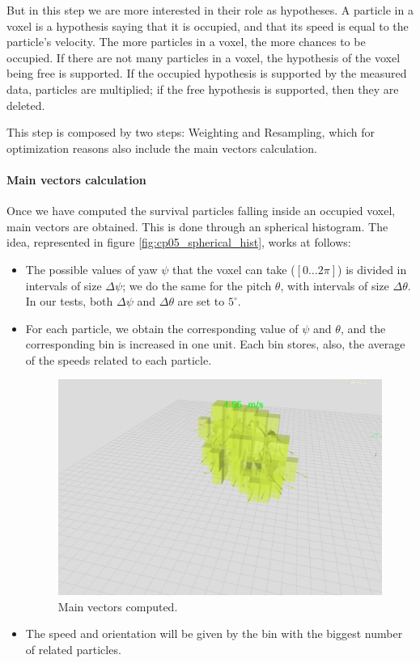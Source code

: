 But in this step we are more interested in their role as hypotheses. A particle in a voxel is a hypothesis saying that it is occupied, and that its speed is equal to the particle's velocity. The more particles in a voxel, the more chances to be occupied. If there are not many particles in a voxel, the hypothesis of the voxel being free is supported. If the occupied hypothesis is supported by the measured data, particles are multiplied; if the free hypothesis is supported, then they are deleted.

This step is composed by two steps: Weighting and Resampling, which for optimization reasons also include the main vectors calculation.

\paragraph{Main vectors calculation}\label{ch:chapter05_01_04_02_01}

Once we have computed the survival particles falling inside an occupied voxel, main vectors are obtained. This is done through an spherical histogram. The idea, represented in figure \ref{fig:cp05_spherical_hist}, works at follows:
\begin{itemize}
 \item The possible values of yaw $\psi$ that the voxel can take ($[0\dots2\pi]$) is divided in intervals of size $\Delta\psi$; we do the same for the pitch $\theta$, with intervals of size $\Delta\theta$. In our tests, both $\Delta\psi$ and $\Delta\theta$ are set to $5^{\circ}$.
 \item For each particle, we obtain the corresponding value of $\psi$ and $\theta$, and the corresponding bin is increased in one unit. Each bin stores, also, the average of the speeds related to each particle.

 \begin{figure}[h!]
  \centering
  \includegraphics{obstacleSpeed}
  \caption{Main vectors computed.}\label{fig:cp05_main_vectors_per_voxel}
\end{figure}
 \item The speed and orientation will be given by the bin with the biggest number of related particles.
\end{itemize}

